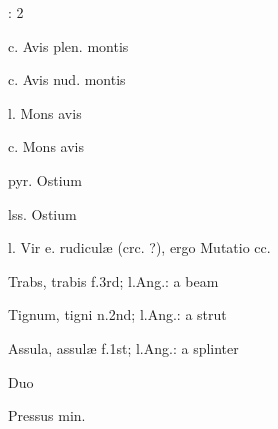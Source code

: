 : {}2{}


 {} {\mktsStyleItalic{}c. Avis plen. montis\/}


 {} {\mktsStyleItalic{}c. Avis nud. montis\/}


 {} {\mktsStyleItalic{}l. Mons avis\/}


 {} {\mktsStyleItalic{}c. Mons avis\/}


 {\mktsStyleItalic{}pyr. Ostium\/}


 {\mktsStyleItalic{}lss. Ostium\/}


 {\mktsStyleItalic{}l. Vir e. rudiculæ\/} (crc. ?), ergo {\mktsStyleItalic{}Mutatio cc.\/}


 {\mktsStyleItalic{}Trabs\/}, trabis {\mktsStyleItalic{}f.3rd\/}; l.Ang.: a beam


 {\mktsStyleItalic{}Tignum\/}, tigni {\mktsStyleItalic{}n.2nd\/}; l.Ang.: a strut


 {\mktsStyleItalic{}Assula\/}, assulæ {\mktsStyleItalic{}f.1st\/}; l.Ang.: a splinter


 {\mktsStyleItalic{}Duo\/}


 {\mktsStyleItalic{}Pressus min.\/}


